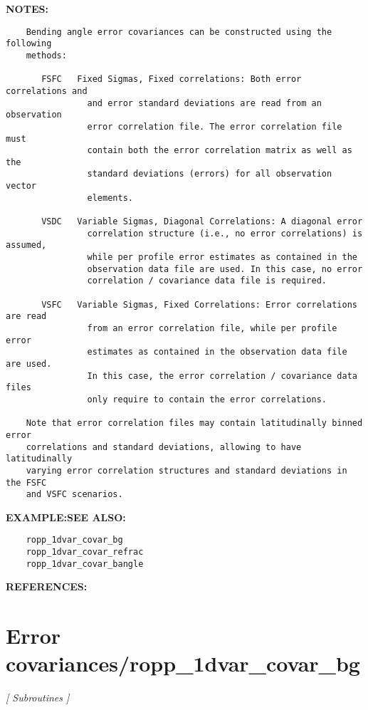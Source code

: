 \textbf{NOTES:}\hspace{0.08in}\begin{Verbatim}
    Bending angle error covariances can be constructed using the following 
    methods:

       FSFC   Fixed Sigmas, Fixed correlations: Both error correlations and
                and error standard deviations are read from an observation
                error correlation file. The error correlation file must 
                contain both the error correlation matrix as well as the
                standard deviations (errors) for all observation vector
                elements.

       VSDC   Variable Sigmas, Diagonal Correlations: A diagonal error 
                correlation structure (i.e., no error correlations) is assumed,
                while per profile error estimates as contained in the 
                observation data file are used. In this case, no error 
                correlation / covariance data file is required.

       VSFC   Variable Sigmas, Fixed Correlations: Error correlations are read
                from an error correlation file, while per profile error 
                estimates as contained in the observation data file are used.
                In this case, the error correlation / covariance data files
                only require to contain the error correlations.

    Note that error correlation files may contain latitudinally binned error
    correlations and standard deviations, allowing to have latitudinally 
    varying error correlation structures and standard deviations in the FSFC  
    and VSFC scenarios.
\end{Verbatim}
\textbf{EXAMPLE:}\hspace{0.08in}\textbf{SEE ALSO:}\hspace{0.08in}\begin{Verbatim}
    ropp_1dvar_covar_bg
    ropp_1dvar_covar_refrac
    ropp_1dvar_covar_bangle
\end{Verbatim}
\textbf{REFERENCES:}\hspace{0.08in}\section{Error covariances/ropp\_1dvar\_covar\_bg}
\textsl{[ Subroutines ]}

